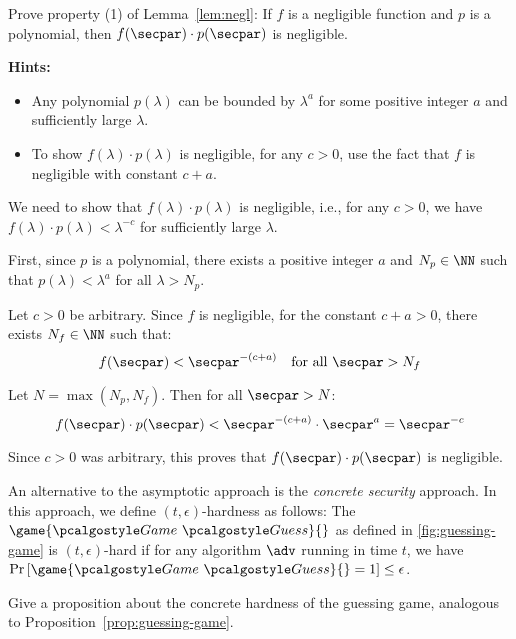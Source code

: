 \begin{exercise}[Optional]\label{ex:negl-property-proof}
  Prove property (1) of Lemma~\ref{lem:negl}: If $f$ is a negligible function and $p$ is a polynomial, then $f(\secpar) \cdot p(\secpar)$ is negligible.
  
  \textbf{Hints:}
  \begin{itemize}
    \item Any polynomial $p(\lambda)$ can be bounded by $\lambda^{a}$ for some positive integer $a$ and sufficiently large $\lambda$.
    \item To show $f(\lambda) \cdot p(\lambda)$ is negligible, for any $c > 0$, use the fact that $f$ is negligible with constant $c + a$.
  \end{itemize}
\end{exercise}

\ifsolutions
\begin{mysolution}
  We need to show that $f(\lambda) \cdot p(\lambda)$ is negligible, i.e., for any $c > 0$, we have $f(\lambda) \cdot p(\lambda) < \lambda^{-c}$ for sufficiently large $\lambda$.
  
  First, since $p$ is a polynomial, there exists a positive integer $a$ and $N_p \in \NN$ such that $p(\lambda) < \lambda^{a}$ for all $\lambda > N_p$.
  
  Let $c > 0$ be arbitrary. Since $f$ is negligible, for the constant $c + a > 0$, there exists $N_f \in \NN$ such that:
  \[
  f(\secpar) < \secpar^{-(c+a)} \quad \text{for all } \secpar > N_f
  \]
  
  Let $N = \max(N_p, N_f)$. Then for all $\secpar > N$:
  \[
  f(\secpar) \cdot p(\secpar) < \secpar^{-(c+a)} \cdot \secpar^{a} = \secpar^{-c}
  \]
  
  Since $c > 0$ was arbitrary, this proves that $f(\secpar) \cdot p(\secpar)$ is negligible.
\end{mysolution}
\fi

\begin{exercise}[Optional]\label{ex:concrete-security}
  An alternative to the asymptotic approach is the \emph{concrete security} approach.
  In this approach, we define $(t,\epsilon)$-hardness as follows:
  The $\game{\Game~\algo{Guess}}{}$ as defined in \autoref{fig:guessing-game} is $(t,\epsilon)$-hard if for any algorithm $\adv$ running in time $t$, we have $\pr{\game{\Game~\algo{Guess}}{} = 1} \le \epsilon$.
  
  Give a proposition about the concrete hardness of the guessing game, analogous to Proposition~\ref{prop:guessing-game}.
\end{exercise}

